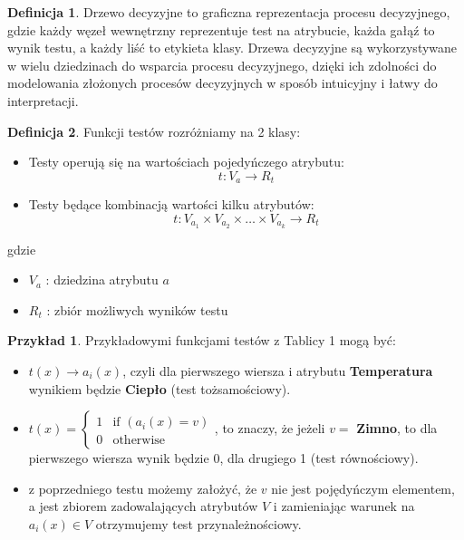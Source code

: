 \documentclass[12pt]{article}
\theoremstyle{definition}
\newtheorem{definition}{Definicja}[section]
\theoremstyle{definition}
\newtheorem{example}{Przykład}[section]
\begin{document}
\begin{definition}
Drzewo decyzyjne to graficzna reprezentacja procesu decyzyjnego, gdzie każdy węzeł wewnętrzny reprezentuje test na atrybucie, każda gałąź to wynik testu, a każdy liść to etykieta klasy. Drzewa decyzyjne są wykorzystywane w wielu dziedzinach do wsparcia procesu decyzyjnego, dzięki ich zdolności do modelowania złożonych procesów decyzyjnych w sposób intuicyjny i łatwy do interpretacji.
\end{definition}

\begin{definition}
    Funkcji testów rozróżniamy na 2 klasy:
    \begin{itemize}
        \item Testy operują się na wartościach pojedyńczego atrybutu:\[
        t: V_a \rightarrow R_t
        \]
        \item Testy będące kombinacją wartości kilku atrybutów: 
        \[
        t: V_{a_1} \times V_{a_2} \times \ldots \times V_{a_k} \rightarrow R_t
        \]
    \end{itemize}
    gdzie
    \begin{itemize}
        \item $V_a$ : dziedzina atrybutu $a$
        \item $R_t$ : zbiór możliwych wyników testu
    \end{itemize}
\end{definition}

\begin{example}
    Przykładowymi funkcjami testów z Tablicy 1 mogą być:
    \begin{itemize}
        \item $t(x) \rightarrow a_i(x)$, czyli dla pierwszego wiersza i atrybutu \textbf{Temperatura} wynikiem będzie \textbf{Ciepło} (test tożsamościowy).
        \item $t(x) = 
        \begin{cases}
            1 & \textrm{if } (a_i(x) = v)\\
            0 & \textrm{otherwise}
        \end{cases}$, to znaczy, że jeżeli $v =$ \textbf{Zimno}, to dla pierwszego wiersza wynik będzie 0, dla drugiego 1 (test równościowy).
        \item z poprzedniego testu możemy założyć, że $v$ nie jest pojędyńczym elementem, a jest zbiorem zadowalających atrybutów $V$ i zamieniając warunek na $a_i(x)\in V$ otrzymujemy test przynależnościowy.
    \end{itemize}
\end{example}
\end{document}
